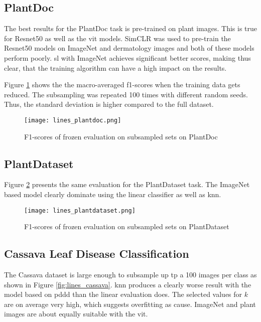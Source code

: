 \subsection{PlantDoc}
The best results for the PlantDoc task is pre-trained on plant images. 
This is true for Resnet50 as well as the \gls{vit} models.
SimCLR was used to pre-train the Resnet50 models on ImageNet and dermatology images and both of these models perform poorly.
\gls{sl} with ImageNet achieves significant better scores, making thus clear, that the training algorithm can have a high impact on the results. 

Figure \ref{fig:lines_plantdoc} shows the the macro-averaged f1-scores when the training data gets reduced.
The subsampling was repeated 100 times with different random seeds. 
Thus, the standard deviation is higher compared to the full dataset.

\begin{figure}[H]
    \begin{center}
    \texttt{[image: lines\_plantdoc.png]}
    \caption{F1-scores of frozen evaluation on subsampled sets on PlantDoc}\label{fig:lines_plantdoc}
    \end{center}
\end{figure}

\subsection{PlantDataset}
Figure \ref{fig:lines_plantdataset} presents the same evaluation for the PlantDataset task.
The ImageNet based model clearly dominate using the linear classifier as well as \gls{knn}.
\begin{figure}[H]
    \begin{center}
    \texttt{[image: lines\_plantdataset.png]}
    \caption{F1-scores of frozen evaluation on subsampled sets on PlantDataset}\label{fig:lines_plantdataset}
    \end{center}
\end{figure}

\subsection{Cassava Leaf Disease Classification}
The Cassava dataset is large enough to subsample up tp a 100 images per class as shown in Figure \ref{fig:lines_cassava}.
\gls{knn} produces a clearly worse result with the model based on \gls{pddd} than the linear evaluation does.
The selected values for $k$ are on average very high, which suggests overfitting as cause.
ImageNet and plant images are about equally suitable with the \gls{vit}.

